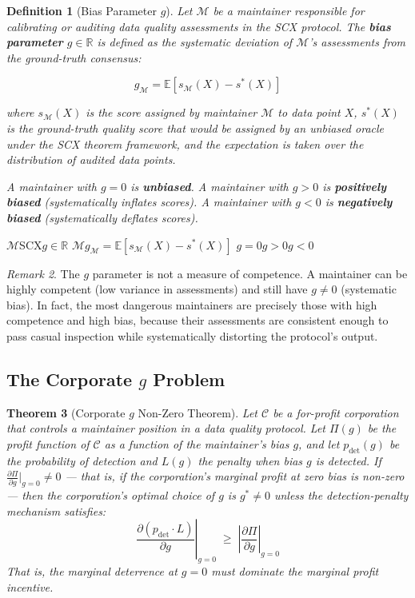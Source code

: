 \documentclass[12pt,a4paper]{article}
\newtheorem{theorem}{Theorem}[section]
\newtheorem{definition}[theorem]{Definition}
\theoremstyle{remark}
\newtheorem{remark}[theorem]{Remark}
\newcommand{\R}{\mathbb{R}}
\newcommand{\E}{\mathbb{E}}
\begin{document}
\begin{definition}[Bias Parameter $g$]
Let $\mathcal{M}$ be a maintainer responsible for calibrating or auditing data
quality assessments in the SCX protocol. The \textbf{bias parameter} $g \in \R$
is defined as the systematic deviation of $\mathcal{M}$'s assessments from the
ground-truth consensus:

\begin{equation}\label{eq:g_def}
    g_{\mathcal{M}} = \E\left[ s_{\mathcal{M}}(X) - s^*(X) \right]
\end{equation}

where $s_{\mathcal{M}}(X)$ is the score assigned by maintainer $\mathcal{M}$ to
data point $X$, $s^*(X)$ is the ground-truth quality score that would be
assigned by an unbiased oracle under the SCX theorem framework, and the
expectation is taken over the distribution of audited data points.

A maintainer with $g = 0$ is \textbf{unbiased}. A maintainer with $g > 0$ is
\textbf{positively biased} (systematically inflates scores). A maintainer with
$g < 0$ is \textbf{negatively biased} (systematically deflates scores).
\end{definition}

\noindent\textbf{}
$\mathcal{M}$SCX$g \in \R$
$\mathcal{M}$$g_{\mathcal{M}} = \E[s_{\mathcal{M}}(X) - s^*(X)]$
$g=0$$g>0$$g<0$


\begin{remark}
The $g$ parameter is not a measure of competence. A maintainer can be highly
competent (low variance in assessments) and still have $g \neq 0$ (systematic
bias). In fact, the most dangerous maintainers are precisely those with high
competence and high bias, because their assessments are consistent enough to
pass casual inspection while systematically distorting the protocol's output.
\end{remark}

\subsection{The Corporate $g$ Problem}

\begin{theorem}[Corporate $g$ Non-Zero Theorem]\label{thm:corp_g}
Let $\mathcal{C}$ be a for-profit corporation that controls a maintainer
position in a data quality protocol. Let $\Pi(g)$ be the profit
function of $\mathcal{C}$ as a function of the maintainer's bias $g$,
and let $p_{\text{det}}(g)$ be the probability of detection and $L(g)$ the
penalty when bias $g$ is detected. If $\frac{\partial \Pi}{\partial g}|_{g=0} \neq 0$
— that is, if the corporation's marginal profit at zero bias is non-zero —
then the corporation's optimal choice of $g$ is $g^* \neq 0$
unless the detection-penalty mechanism satisfies:
\begin{equation}
    \left.\frac{\partial(p_{\text{det}} \cdot L)}{\partial g}\right|_{g=0}
    \;\geq\; \left|\frac{\partial \Pi}{\partial g}\right|_{g=0}
\end{equation}
That is, the marginal deterrence at $g=0$ must dominate the marginal profit incentive.
\end{theorem}
\end{document}
